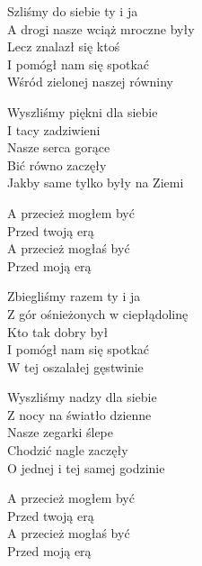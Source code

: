 \begin{text}
    Szliśmy do siebie ty i ja\\
    A drogi nasze wciąż mroczne były\\
    Lecz znalazł się ktoś\\
    I pomógł nam się spotkać\\
    Wśród zielonej naszej równiny

    Wyszliśmy piękni dla siebie\\
    I tacy zadziwieni\\
    Nasze serca gorące\\
    Bić równo zaczęły\\
    Jakby same tylko były na Ziemi

    A przecież mogłem być\\
    Przed twoją erą\\
    A przecież mogłaś być\\
    Przed moją erą

    Zbiegliśmy razem ty i ja\\
    Z gór ośnieżonych w ciepłądolinę\\
    Kto tak dobry był\\
    I pomógł nam się spotkać\\
    W tej oszalałej gęstwinie

    Wyszliśmy nadzy dla siebie\\
    Z nocy na światło dzienne\\
    Nasze zegarki ślepe\\
    Chodzić nagle zaczęły\\
    O jednej i tej samej godzinie

    A przecież mogłem być\\
    Przed twoją erą\\
    A przecież mogłaś być\\
    Przed moją erą
\end{text}
\begin{chord}

\end{chord}
